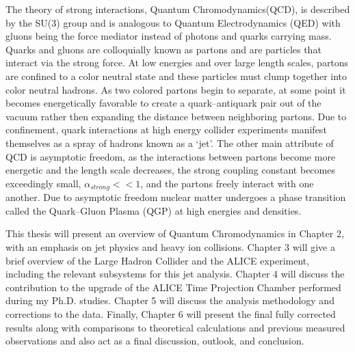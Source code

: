 \par
The theory of strong interactions, Quantum Chromodynamics(QCD), is described by the SU(3) group and is analogous to Quantum Electrodynamics (QED) with gluons being the force mediator instead of photons and quarks carrying mass.  Quarks and gluons are colloquially known as partons and are particles that interact via the strong force.  At low energies and over large length scales, partons are confined to a color neutral state and these particles must clump together into color neutral hadrons.  As two colored partons begin to separate, at some point it becomes energetically favorable to create a quark--antiquark pair out of the vacuum rather then expanding the distance between neighboring partons.  Due to confinement, quark interactions at high energy collider experiments manifest themselves as a spray of hadrons known as a `jet'.  The other main attribute of QCD is asymptotic freedom, as the interactions between partons become more energetic and the length scale decreases, the strong coupling constant becomes exceedingly small, $ \alpha_{strong} << 1$, and the partons freely interact with one another.  Due to asymptotic freedom nuclear matter undergoes a phase transition called the Quark--Gluon Plasma (QGP) at high energies and densities. 






\par
This thesis will present an overview of Quantum Chromodynamics in Chapter 2, with an emphasis on jet physics and heavy ion collisions.  Chapter 3 will give a brief overview of the Large Hadron Collider and the ALICE experiment, including the relevant subsystems for this jet analysis.  Chapter 4 will discuss the contribution to the upgrade of the ALICE Time Projection Chamber performed during my Ph.D. studies.  Chapter 5 will discuss the analysis methodology and corrections to the data.  Finally, Chapter 6 will present the final fully corrected results along with comparisons to theoretical calculations and previous measured observations and also act as a final discussion, outlook, and conclusion. 